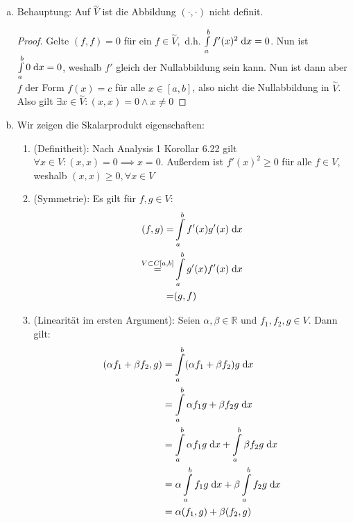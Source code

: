 \documentclass{article}
\theoremstyle{definition}
\newcommand{\R}{\mathbb{R}}
\begin{document}
\begin{enumerate}[(a)]
	\item Behauptung: Auf $\overset{\sim}{V}$ ist die Abbildung $(\cdot,\cdot)$ nicht definit.
	\begin{proof}
		Gelte $(f,f)=0$ für ein $f\in \overset{\sim}{V},$ d.h. $\int\limits_{a}^{b}f'(x)^2 \d x=0$. Nun ist $\int\limits_{a}^{b}0\d x=0$, weshalb $f'$ gleich der Nullabbildung sein kann. Nun ist dann aber $f$ der Form $f(x)=c$ für alle $x\in [a,b]$, also nicht die Nullabbildung in $\overset{\sim}{V}$. Also gilt $\exists x\in \overset{\sim}{V}: (x,x)=0 \wedge x\neq 0$  
	\end{proof}
	\item Wir zeigen die Skalarprodukt eigenschaften:
	\begin{enumerate}[(S1)]
		\item (Definitheit): Nach Analysis 1 Korollar 6.22 gilt $\forall x\in V: (x,x)=0\implies x=0$.  Außerdem ist $f'(x)^2\geq 0$ für alle $f\in V$, weshalb $(x,x)\geq 0, \forall x\in V$
		\item (Symmetrie): Es gilt für $f,g\in V$:
		\begin{align*}
			(f,g)=& \int\limits_{a}^{b}f'(x)g'(x)\d x \\
			\overset{V\subset C[a,b]}{=}& \int\limits_{a}^{b}g'(x)f'(x)\d x\\
			=& (g,f)\\
		\end{align*}
		\item (Linearität im ersten Argument): Seien $\alpha, \beta\in \R$ und $f_1,f_2,g\in V$. Dann gilt:
			\begin{align*}
				(\alpha f_1+\beta f_2,g)&= \int\limits_{a}^{b}(\alpha f_1+\beta f_2)g \d x\\
				&=  \int\limits_{a}^{b}\alpha f_1g+\beta f_2 g \d x\\
				&= \int\limits_{a}^{b}\alpha f_1g\d x+\int\limits_{a}^{b}\beta f_2g\d x\\
				&= \alpha\int\limits_{a}^{b}f_1g\d x+\beta\int\limits_{a}^{b} f_2g\d x\\
				& =\alpha(f_1,g)+\beta(f_2,g)
			\end{align*}
		\end{enumerate}
\end{enumerate}
\end{document}
